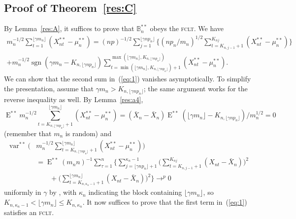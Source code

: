 \documentclass[12pt]{article}
\theoremstyle{definition}
\DeclareMathOperator{\E}{E}
\DeclareMathOperator{\sgn}{sgn}
\DeclareMathOperator{\var}{var}
\newcommand{\fclt}{\textsc{fclt}}
\begin{document}
\subsection*{Proof of Theorem~\ref{res:C}}
By Lemma~\ref{res:A}, it suffices to prove that $\mathbb{B}_n^{**}$
obeys the \fclt.  We have
\begin{multline}\label{eq:1}
  m_n^{-1/2} \sum_{t=1}^{\lfloor \gamma m_n \rfloor} (X_{nt}^{**} -
  \mu_n^{**}) = (n p)^{-1/2} \sum_{j=1}^{\lfloor \gamma n p_n \rfloor}
  \Big\{(n p_n/m_n)^{1/2} \sum_{t = K_{n,j-1} + 1}^{K_{nj}}
  (X_{nt}^{**} - \mu_n^{**})\Big\} \\ + m_n^{-1/2} \sgn(\gamma m_n -
  K_{n,\lfloor \gamma n p_n \rfloor}) \sum_{t = \min(\lfloor \gamma
    m_n \rfloor, K_{n,\lfloor \gamma n p_n \rfloor}) +
    1}^{\max(\lfloor \gamma m_n \rfloor, K_{n,\lfloor \gamma n p_n
      \rfloor})} (X_{nt}^{**} - \mu_n^{**}).
\end{multline}
We can show that the second sum in~(\ref{eq:1}) vanishes
asymptotically.  To simplify the presentation, assume that $\gamma m_n
> K_{n,\lfloor \gamma n p_n \rfloor}$; the same argument works for the
reverse inequality as well.  By Lemma~\ref{res:a4},
\begin{equation}
  \E^{**} m_n^{-1/2} \sum_{t = K_{n,\lfloor \gamma n p_n \rfloor} +
    1}^{\lfloor \gamma m_n\rfloor} (X_{nt}^{**} - \mu_n^{**})=
  (\bar X_n - \bar X_n) \E^{**} (\lfloor \gamma m_n
  \rfloor - K_{n,\lfloor \gamma n p_n \rfloor})/ m_n^{1/2} = 0
\end{equation}
(remember that $m_n$ is random) and
\begin{align}
  \var^{**}\Big(&m_n^{-1/2} \sum_{t = K_{n,\lfloor \gamma n p_n
      \rfloor} + 1}^{\lfloor \gamma m_n\rfloor} (X_{nt}^{**} -
  \mu_n^{**})\Big) \\&= \E^{**} (m_n n)^{-1} \sum_{\tau=1}^n
  \Bigg\{\sum_{j=\lfloor\gamma n p_n \rfloor + 1}^{\kappa_n - 1}
  \Bigg(\sum_{t=K_{n,j-1}+1}^{K_{nj}} (X_{nt} - \bar{X}_n)\Bigg)^2 \\
  &\qquad+ \Bigg(\sum_{t=K_{n,\kappa_n-1}+1}^{\lfloor \gamma m_n
    \rfloor} (X_{nt} - \bar{X}_n)\Bigg)^2 \Bigg\} \to^p 0
\end{align}
uniformly in $\gamma$ by \citet[Theorem~1.6]{Mcl:75}, with $\kappa_n$
indicating the block containing $\lfloor \gamma m_n \rfloor$, so
$K_{n,\kappa_n-1} < \lfloor \gamma m_n \rfloor \leq K_{n,\kappa_n}$.
It now suffices to prove that the first term in~(\ref{eq:1}) satisfies
an \fclt.
\end{document}
